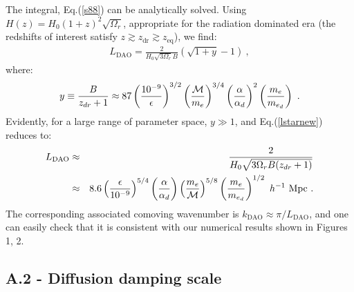 \documentclass[12pt]{article}
\begin{document}
The integral, Eq.(\ref{s88}) can be analytically solved. Using $H(z) = H_0 (1 + z)^2 \sqrt{\Omega_r}$, appropriate for the radiation dominated era (the redshifts of interest satisfy $z \gtrsim z_{\text{dr}} \gtrsim z_{\text{eq}}$), we find:
%
\begin{eqnarray}
L_{\text{DAO}} = \frac{2}{H_0 \sqrt{3\Omega_r} B} \left( \sqrt{1 + y}  - 1 \right) \ ,
\label{lstarnew}
\end{eqnarray}
%
where:
%
\begin{eqnarray}
y \equiv \frac{B}{z_{dr}+1} \approx  87 \left( \frac{10^{-9}}{\epsilon}\right)^{3/2} \left( \frac{{\cal M}}{m_e} \right)^{3/4} \left( \frac{\alpha} {\alpha_d}\right)^2 \left( \frac{m_e}{m_{e_d}}\right) \ .
\end{eqnarray}
%
Evidently, for a large range of parameter space, $y \gg 1$, and Eq.(\ref{lstarnew}) reduces to:
%
\begin{eqnarray}
L_{\text{DAO}} &\approx & \frac{2}{H_0 \sqrt{3\Omega_r B (z_{dr}+1)}}  \nonumber \\
& \approx & 8.6 \left( \frac{\epsilon}{10^{-9}}\right)^{5/4} \left( \frac{\alpha}{\alpha_d}\right) \left(\frac{m_e}{{\cal M}}\right)^{5/8} \left(\frac{m_e}{m_{e_d}}\right)^{1/2} \ h^{-1} \ {\rm Mpc} \ .
\label{Ls1}
\end{eqnarray}
The corresponding associated comoving wavenumber is $k_{\text{DAO}} \approx \pi/L_{\text{DAO}}$, and one can easily check that it is consistent with our numerical results shown in Figures 1, 2.
%
%

\subsection*{A.2 - Diffusion damping scale}
\end{document}
